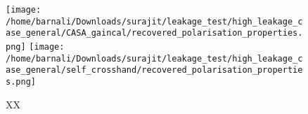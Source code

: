 \documentclass{article}
\begin{document}
\begin{figure}
\centering
\texttt{[image: /home/barnali/Downloads/surajit/leakage\_test/high\_leakage\_case\_general/CASA\_gaincal/recovered\_polarisation\_properties.png]}
\texttt{[image: /home/barnali/Downloads/surajit/leakage\_test/high\_leakage\_case\_general/self\_crosshand/recovered\_polarisation\_properties.png]}
\caption{XX}
\label{fig:compare_linear_nonlinear_terms_with_diagonal}
\end{figure}
\end{document}

